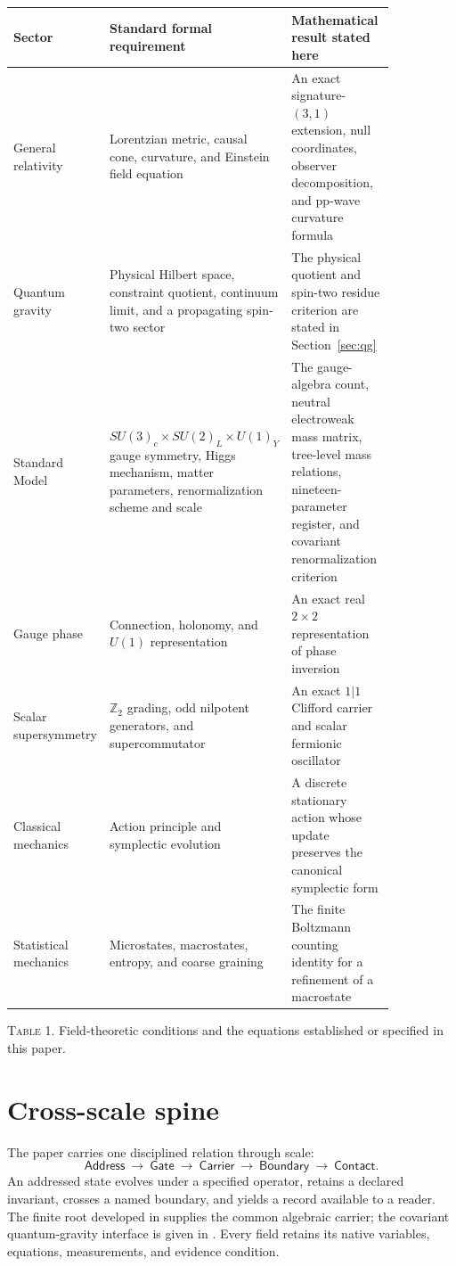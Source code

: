 \begin{center}
\small
\begin{tabular}{L{0.24\linewidth}L{0.32\linewidth}L{0.29\linewidth}}
\toprule
\textbf{Sector} & \textbf{Standard formal requirement} & \textbf{Mathematical result stated here}\\
\midrule
General relativity &
Lorentzian metric, causal cone, curvature, and Einstein field equation &
An exact signature-$(3,1)$ extension, null coordinates, observer
decomposition, and pp-wave curvature formula\\
\addlinespace
Quantum gravity &
Physical Hilbert space, constraint quotient, continuum limit, and a
propagating spin-two sector &
The physical quotient and spin-two residue criterion are stated in
Section~\ref{sec:qg}\\
\addlinespace
Standard Model &
$SU(3)_c\times SU(2)_L\times U(1)_Y$ gauge symmetry, Higgs mechanism,
matter parameters, renormalization scheme and scale &
The gauge-algebra count, neutral electroweak mass matrix, tree-level
mass relations, nineteen-parameter register, and covariant renormalization
criterion\\
\addlinespace
Gauge phase &
Connection, holonomy, and $U(1)$ representation &
An exact real $2\times2$ representation of phase inversion\\
\addlinespace
Scalar supersymmetry &
$\mathbb Z_2$ grading, odd nilpotent generators, and supercommutator &
An exact $1|1$ Clifford carrier and scalar fermionic oscillator\\
\addlinespace
Classical mechanics &
Action principle and symplectic evolution &
A discrete stationary action whose update preserves the canonical
symplectic form\\
\addlinespace
Statistical mechanics &
Microstates, macrostates, entropy, and coarse graining &
The finite Boltzmann counting identity for a refinement of a macrostate\\
\bottomrule
\end{tabular}
\par\smallskip
\textsc{Table 1.} Field-theoretic conditions and the equations established or
specified in this paper.
\end{center}

\section{Cross-scale spine}
\label{sec:spine}

The paper carries one disciplined relation through scale:
\[
\mathsf{Address}\ \longrightarrow\ \mathsf{Gate}\ \longrightarrow\
\mathsf{Carrier}\ \longrightarrow\ \mathsf{Boundary}\ \longrightarrow\
\mathsf{Contact}.
\tag{R1}
\]
An addressed state evolves under a specified operator, retains a declared
invariant, crosses a named boundary, and yields a record available to a
reader.  The finite root developed in \cite{coppa-mms} supplies the common
algebraic carrier; the covariant quantum-gravity interface is given in
\cite{coppa-lqg}.  Every field retains its native variables, equations,
measurements, and evidence condition.

